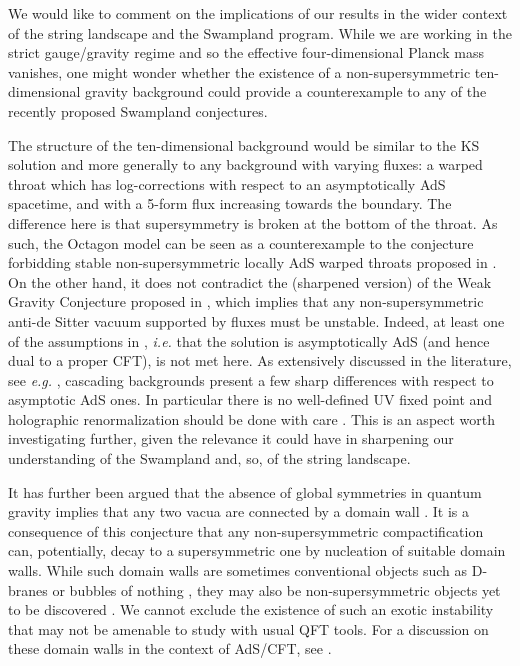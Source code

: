 \documentclass[a4paper,12pt]{article}
\begin{document}
{We would like to comment on the implications of our results in the wider context of the string landscape and the Swampland program. While we are working in the strict gauge/gravity regime and so the effective four-dimensional Planck mass vanishes, one might wonder whether the existence of a non-supersymmetric ten-dimensional gravity background could provide a counterexample to any of the recently proposed Swampland conjectures. 

The structure of the ten-dimensional background would be similar to the KS solution \cite{Klebanov:2000hb}  and more generally to any background with varying fluxes: 
a warped throat which has log-corrections with respect to an asymptotically AdS spacetime, and with a 5-form flux increasing towards the boundary. The difference here is that supersymmetry is broken at the bottom of the throat. As such, the Octagon model can be seen as a counterexample to the conjecture forbidding stable non-supersymmetric locally AdS warped throats proposed in \cite{Buratti:2018onj}. On the other hand, it does not contradict the (sharpened version) of  the Weak Gravity Conjecture proposed in \cite{Ooguri:2016pdq,Freivogel:2016qwc}, which implies that any non-supersymmetric anti-de Sitter vacuum supported by fluxes must be unstable. Indeed, at least one of the assumptions in \cite{Ooguri:2016pdq,Freivogel:2016qwc}, {\it i.e.} that the solution is asymptotically AdS (and hence dual to a proper CFT), is not met here. As extensively discussed in the literature, see {\it e.g.} \cite{Aharony:2005zr,Buchel:2005cv,Aharony:2006ce}, cascading backgrounds present a few sharp differences with respect to asymptotic AdS ones. In particular there is no well-defined UV fixed point and holographic renormalization should be done with care \cite{Bertolini:2015hua,Krishnan:2018udc}. This is an aspect worth investigating further, given the relevance it could have in sharpening our understanding of the Swampland and, so, of the string landscape.
 
It has further been argued that the absence of global symmetries in quantum gravity implies that any two vacua are connected by a domain wall \cite{McNamara:2019rup}. It is a consequence of this conjecture that any non-supersymmetric compactification can, potentially, decay to a supersymmetric one by nucleation of suitable domain walls. While such domain walls are sometimes conventional objects such as D-branes or bubbles of nothing \cite{GarciaEtxebarria:2020xsr}, they may also be non-supersymmetric objects yet to be discovered \cite{McNamara:2019rup}. We cannot exclude the existence of such an exotic instability that may not be amenable to study with usual QFT tools. For a discussion on these domain walls in the context of AdS/CFT, see \cite{Ooguri:2020sua}.

}
\end{document}
